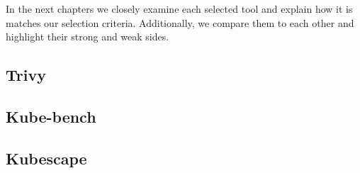In the next chapters we closely examine each selected tool and explain how it is matches our selection criteria. Additionally, we compare them to each other and highlight their strong and weak sides.

\subsection{Trivy}

\subsection{Kube-bench}

\subsection{Kubescape}